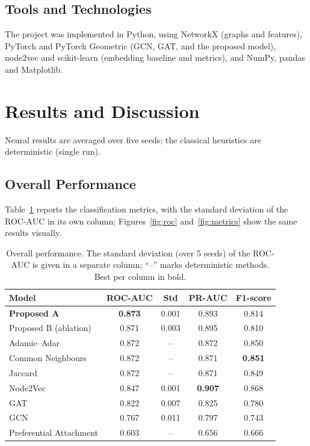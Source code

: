 \documentclass[11pt,a4paper]{article}
\begin{document}
\subsection{Tools and Technologies}
The project was implemented in Python, using NetworkX (graphs and features), PyTorch and PyTorch
Geometric (GCN, GAT, and the proposed model), node2vec and scikit-learn (embedding baseline and
metrics), and NumPy, pandas and Matplotlib.

\section{Results and Discussion}

Neural results are averaged over five seeds; the classical heuristics are deterministic (single run).

\subsection{Overall Performance}
Table~\ref{tab:main} reports the classification metrics, with the standard deviation of the ROC-AUC
in its own column; Figures~\ref{fig:roc} and~\ref{fig:metrics} show the same results visually.

\begin{table}[htbp]\centering
\caption{Overall performance. The standard deviation (over 5 seeds) of the ROC-AUC is given in a
separate column; ``--'' marks deterministic methods. Best per column in bold.}
\label{tab:main}
\begin{tabular}{@{}l c c c c@{}}
\toprule
\textbf{Model} & \textbf{ROC-AUC} & \textbf{Std} & \textbf{PR-AUC} & \textbf{F1-score}\\
\midrule
\textbf{Proposed A} & \textbf{0.873} & 0.001 & 0.893 & 0.814\\
Proposed B (ablation) & 0.871 & 0.003 & 0.895 & 0.810\\
Adamic--Adar & 0.872 & -- & 0.872 & 0.850\\
Common Neighbours & 0.872 & -- & 0.871 & \textbf{0.851}\\
Jaccard & 0.872 & -- & 0.871 & 0.849\\
Node2Vec & 0.847 & 0.001 & \textbf{0.907} & 0.868\\
GAT & 0.822 & 0.007 & 0.825 & 0.780\\
GCN & 0.767 & 0.011 & 0.797 & 0.743\\
Preferential Attachment & 0.603 & -- & 0.656 & 0.666\\
\bottomrule
\end{tabular}
\end{table}
\end{document}
